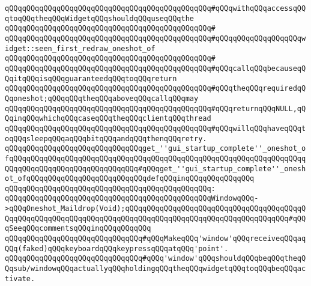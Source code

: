 \verb|qQQqqQQqqQQqqQQqqQQqqQQqqQQqqQQqqQQqqQQqqQQqqQQq#qQQqwithqQQqaccessqQQqtoqQQqtheqQQqWidgetqQQqshouldqQQquseqQQqthe|\newline
\verb|qQQqqQQqqQQqqQQqqQQqqQQqqQQqqQQqqQQqqQQqqQQqqQQq#|\newline
\verb|qQQqqQQqqQQqqQQqqQQqqQQqqQQqqQQqqQQqqQQqqQQqqQQq#qQQqqQQqqQQqqQQqqQQqwidget::seen_first_redraw_oneshot_of|\newline
\verb|qQQqqQQqqQQqqQQqqQQqqQQqqQQqqQQqqQQqqQQqqQQqqQQq#|\newline
\verb|qQQqqQQqqQQqqQQqqQQqqQQqqQQqqQQqqQQqqQQqqQQqqQQq#qQQqcallqQQqbecauseqQQqitqQQqisqQQqguaranteedqQQqtoqQQqreturn|\newline
\verb|qQQqqQQqqQQqqQQqqQQqqQQqqQQqqQQqqQQqqQQqqQQqqQQq#qQQqtheqQQqrequiredqQQqoneshot;qQQqqQQqtheqQQqaboveqQQqcallqQQqmay|\newline
\verb|qQQqqQQqqQQqqQQqqQQqqQQqqQQqqQQqqQQqqQQqqQQqqQQq#qQQqreturnqQQqNULL,qQQqinqQQqwhichqQQqcaseqQQqtheqQQqclientqQQqthread|\newline
\verb|qQQqqQQqqQQqqQQqqQQqqQQqqQQqqQQqqQQqqQQqqQQqqQQq#qQQqwillqQQqhaveqQQqtoqQQqsleepqQQqaqQQqbitqQQqandqQQqthenqQQqretry.|\newline
\newline
\newline
\verb|qQQqqQQqqQQqqQQqqQQqqQQqqQQqqQQqget_''gui_startup_complete''_oneshot_ofqQQqqQQqqQQqqQQqqQQqqQQqqQQqqQQqqQQqqQQqqQQqqQQqqQQqqQQqqQQqqQQqqQQqqQQqqQQqqQQqqQQqqQQqqQQqqQQqqQQq#qQQqget_''gui_startup_complete''_oneshot_ofqQQqqQQqqQQqqQQqqQQqqQQqqQQqdefqQQqinqQQqqQQqqQQqqQQq|\newline
\verb|qQQqqQQqqQQqqQQqqQQqqQQqqQQqqQQqqQQqqQQqqQQqqQQq:|\newline
\verb|qQQqqQQqqQQqqQQqqQQqqQQqqQQqqQQqqQQqqQQqqQQqqQQqWindowqQQq->qQQqOneshot_Maildrop(Void);qQQqqQQqqQQqqQQqqQQqqQQqqQQqqQQqqQQqqQQqqQQqqQQqqQQqqQQqqQQqqQQqqQQqqQQqqQQqqQQqqQQqqQQqqQQqqQQqqQQqqQQqqQQq#qQQqSeeqQQqcommentsqQQqinqQQqqQQqqQQq|\newline
\newline
\verb|qQQqqQQqqQQqqQQqqQQqqQQqqQQqqQQq#qQQqMakeqQQq'window'qQQqreceiveqQQqaqQQq(faked)qQQqkeyboardqQQqkeypressqQQqatqQQq'point'.|\newline
\verb|qQQqqQQqqQQqqQQqqQQqqQQqqQQqqQQq#qQQq'window'qQQqshouldqQQqbeqQQqtheqQQqsub/windowqQQqactuallyqQQqholdingqQQqtheqQQqwidgetqQQqtoqQQqbeqQQqactivate.|\newline
